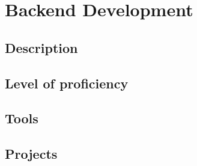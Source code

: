 \section{Backend Development}

\subsection{Description}
\subsection{Level of proficiency}
\subsection{Tools}
\subsection{Projects}

\newpage
